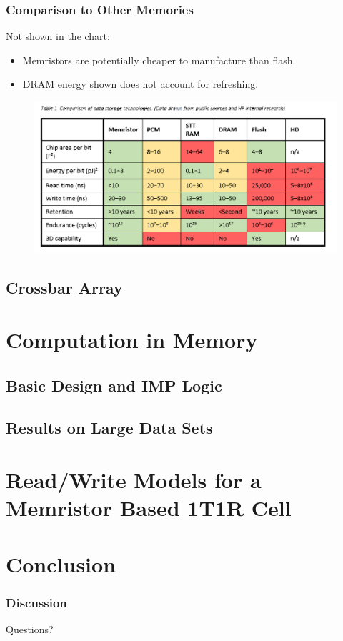 \documentclass{beamer}
\begin{document}
\begin{frame}
  \frametitle{Comparison to Other Memories}
  
  Not shown in the chart:
\begin{itemize}
\item Memristors are potentially cheaper to manufacture than flash.
\item DRAM energy shown does not account for refreshing.

\end{itemize}
  
\begin{figure}
\includegraphics[height=45mmh]{Comparison-of-Data-Storage-2.pdf}
\end{figure}
\end{frame}
\subsection{Crossbar Array}

\section{Computation in Memory}

\subsection{Basic Design and IMP Logic}

\subsection{Results on Large Data Sets}

\section{Read/Write Models for a Memristor Based 1T1R Cell}

\section{Conclusion}

\begin{frame}
  \frametitle{Discussion}
Questions?
\end{frame}
\end{document}
